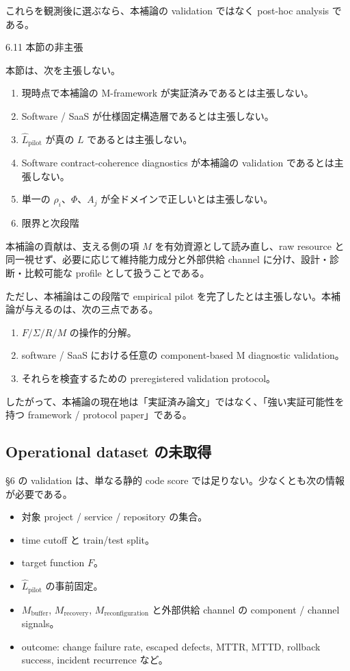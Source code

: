 \documentclass[12pt,a4paper]{article}
\begin{document}
これらを観測後に選ぶなら、本補論の validation ではなく post-hoc analysis である。

6.11 本節の非主張

本節は、次を主張しない。

\begin{enumerate}
\def\labelenumi{\arabic{enumi}.}
\item
  現時点で本補論の M-framework が実証済みであるとは主張しない。
\item
  Software / SaaS が仕様固定構造層であるとは主張しない。
\item
  \(\hat L_{\mathrm{pilot}}\) が真の \(L\) であるとは主張しない。
\item
  Software contract-coherence diagnostics が本補論の validation であるとは主張しない。
\item
  単一の \(\rho_i\)、\(\Phi\)、\(A_j\) が全ドメインで正しいとは主張しない。
\item
  限界と次段階
\end{enumerate}

本補論の貢献は、支える側の項 \(M\) を有効資源として読み直し、raw resource と同一視せず、必要に応じて維持能力成分と外部供給 channel に分け、設計・診断・比較可能な profile として扱うことである。

ただし、本補論はこの段階で empirical pilot を完了したとは主張しない。本補論が与えるのは、次の三点である。

\begin{enumerate}
\def\labelenumi{\arabic{enumi}.}
\tightlist
\item
  \(F / \Sigma / R / M\) の操作的分解。
\item
  software / SaaS における任意の component-based M diagnostic validation。
\item
  それらを検査するための preregistered validation protocol。
\end{enumerate}

したがって、本補論の現在地は「実証済み論文」ではなく、「強い実証可能性を持つ framework / protocol paper」である。

\subsection{Operational dataset の未取得}\label{operational-dataset-ux306eux672aux53d6ux5f97}

§6 の validation は、単なる静的 code score では足りない。少なくとも次の情報が必要である。

\begin{itemize}
\tightlist
\item
  対象 project / service / repository の集合。
\item
  time cutoff と train/test split。
\item
  target function \(F\)。
\item
  \(\hat L_{\mathrm{pilot}}\) の事前固定。
\item
  \(M_{\mathrm{buffer}}\), \(M_{\mathrm{recovery}}\), \(M_{\mathrm{reconfiguration}}\) と外部供給 channel の component / channel signals。
\item
  outcome: change failure rate, escaped defects, MTTR, MTTD, rollback success, incident recurrence など。
\end{itemize}
\end{document}
